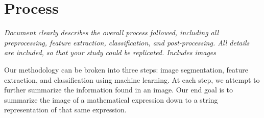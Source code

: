 \section{Process}
\textit{Document clearly describes the overall process followed, including all preprocessing, feature extraction, classification, and post-processing. All details are included, so that your study could be replicated. Includes images
}

Our methodology can be broken into three steps: image segmentation, feature extraction, and classification using machine learning. At each step, we attempt to further summarize the information found in an image. Our end goal is to summarize the image of a mathematical expression down to a string representation of that same expression.
%

%

%

